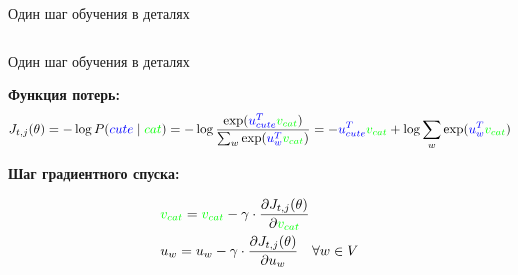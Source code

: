 \documentclass[notes,12pt, aspectratio=169]{beamer}
\begin{document}
\begin{frame}{Один шаг обучения в деталях}
\begin{columns}[T]
\begin{column}{.7\textwidth}
\begin{center}
		\end{center}
	\end{column}%

	\end{columns}
\end{frame}



\begin{frame}{Один шаг обучения в деталях}
	
		\textbf{Функция потерь:}
		{\small
	   \[ 
		J_{t,j}(\theta) = - \log P({\color{blue} cute} \mid {\color{green} cat} ) = - \log \frac{ \exp({\color{blue}  u^T_{cute}} {\color{green}  v_{cat}} )}{\sum_w \exp({\color{blue}  u_w^T} {\color{green} v_{cat} }) }   = - {\color{blue}  u^T_{cute}} {\color{green}  v_{cat}} +  \log \sum_w \exp({\color{blue}  u_w^T} {\color{green} v_{cat} })
		\]}
		
		\vfill
		
		\textbf{Шаг градиентного спуска:}
		
		\begin{equation*} 
		\begin{aligned} 
			&  {\color{green}  v_{cat}} =  {\color{green}  v_{cat}} -  \gamma \cdot  \frac{\partial J_{t,j}(\theta)  }{\partial  {\color{green}  v_{cat}} } \\ 
			& u_w = u_w  -  \gamma \cdot  \frac{\partial J_{t,j}(\theta)  }{\partial u_w} \quad \forall w \in V
		\end{aligned}
		\end{equation*}
\end{frame}
\end{document}
